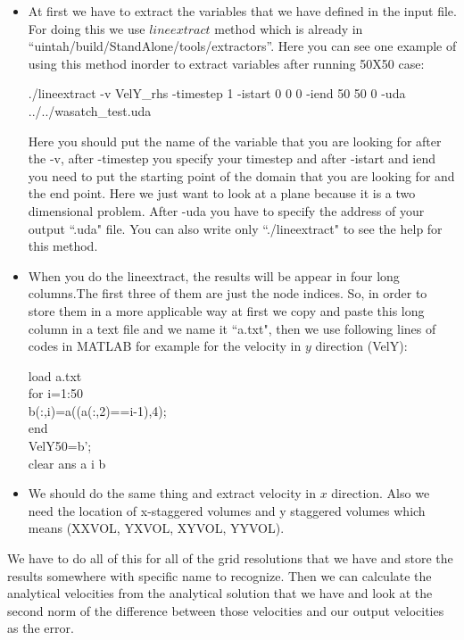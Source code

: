 \documentclass[10pt] {article}
\begin{document}
\begin{itemize}
\item
At first we have to extract the variables that we have defined in the input file. For doing this we use $lineextract$ method which is already in\\``uintah/build/StandAlone/tools/extractors''. Here you can see one example of using this method inorder to extract variables after running 50X50 case:

./lineextract -v VelY\_rhs -timestep 1 -istart 0 0 0 -iend 50 50 0 -uda ../../wasatch\_test.uda

Here you should put the name of the variable that you are looking for after the -v, after -timestep you specify your timestep and after -istart and iend you need to put the starting point of the domain that you are looking for and the end point. Here we just want to look at a plane because it is a two dimensional problem. After -uda you have to specify the address of your output ``.uda" file. You can also write only ``./lineextract" to see the help for this method.
\item
When you do the lineextract, the results will be appear in four long columns.The first three of them are just the node indices. So, in order to store them in a more applicable way at first we copy and paste this long column in a text file and we name it ``a.txt", then we use following lines of codes in MATLAB for example for the velocity in $y$ direction (VelY):

load a.txt\\
for i=1:50\\
b(:,i)=a((a(:,2)==i-1),4);\\
end\\
VelY50=b';\\
clear ans a i b

\item
We should do the same thing and extract velocity in $x$ direction. Also we need the location of x-staggered volumes and y staggered volumes which means (XXVOL, YXVOL, XYVOL, YYVOL).

\end{itemize}

We have to do all of this for all of the grid resolutions that we have and store the results somewhere with specific name to recognize. Then we can calculate the analytical velocities from the analytical solution that we have and look at the second norm of the difference between those velocities and our output velocities as the error.
\end{document}
